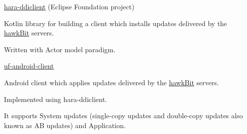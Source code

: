 \newpage
{}


\begin{cventries}

  \cventry
    {\href{https://github.com/eclipse-hara/hara-ddiclient}{\underline{hara-ddiclient}} (Eclipse Foundation project)} %
    {} %
    {} %
    {} %
    {
    \begin{cvitems}
    		\item Kotlin library for building a client which installs updates delivered by the \href{https://eclipse.dev/hawkit/}{\underline{hawkBit}} servers.
    		\item Written with Actor model paradigm.
    \end{cvitems}
    }

  \cventry
    {\href{https://github.com/Kynetics/uf-android-client}{\underline{uf-android-client}}} %
    {} %
    {} %
    {} %
    {
    \begin{cvitems}
      \item Android client which applies updates delivered by the \href{https://eclipse.dev/hawkit/}{\underline{hawkBit}} servers.
    	  \item Implemented using hara-ddiclient.
    	  \item It supports System updates (single-copy updates and double-copy updates also known as AB updates) and Application.
    \end{cvitems}
    }

\end{cventries}
